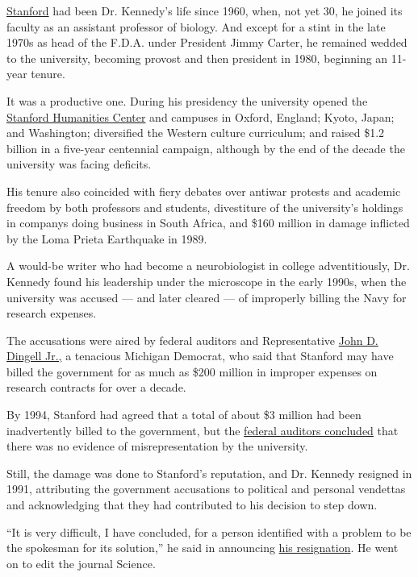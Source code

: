 \href{https://www.stanford.edu/}{Stanford} had been Dr. Kennedy's life
since 1960, when, not yet 30, he joined its faculty as an assistant
professor of biology. And except for a stint in the late 1970s as head
of the F.D.A. under President Jimmy Carter, he remained wedded to the
university, becoming provost and then president in 1980, beginning an
11-year tenure.

It was a productive one. During his presidency the university opened the
\href{http://shc.stanford.edu/}{Stanford Humanities Center} and campuses
in Oxford, England; Kyoto, Japan; and Washington; diversified the
Western culture curriculum; and raised \$1.2 billion in a five-year
centennial campaign, although by the end of the decade the university
was facing deficits.

His tenure also coincided with fiery debates over antiwar protests and
academic freedom by both professors and students, divestiture of the
university's holdings in companys doing business in South Africa, and
\$160 million in damage inflicted by the Loma Prieta Earthquake in 1989.

A would-be writer who had become a neurobiologist in college
adventitiously, Dr. Kennedy found his leadership under the microscope in
the early 1990s, when the university was accused --- and later cleared
--- of improperly billing the Navy for research expenses.

The accusations were aired by federal auditors and Representative
\href{https://www.nytimes.com/2019/02/07/us/politics/john-dingell-dead-longest-congressman.html}{John
D. Dingell Jr.,} a tenacious Michigan Democrat, who said that Stanford
may have billed the government for as much as \$200 million in improper
expenses on research contracts for over a decade.

By 1994, Stanford had agreed that a total of about \$3 million had been
inadvertently billed to the government, but the
\href{https://www.nytimes.com/1994/10/19/us/navy-settles-a-fraud-case-on-stanford-research-costs.html}{federal
auditors concluded} that there was no evidence of misrepresentation by
the university.

Still, the damage was done to Stanford's reputation, and Dr. Kennedy
resigned in 1991, attributing the government accusations to political
and personal vendettas and acknowledging that they had contributed to
his decision to step down.

``It is very difficult, I have concluded, for a person identified with a
problem to be the spokesman for its solution,'' he said in announcing
\href{https://www.nytimes.com/1991/07/30/us/stanford-chief-quits-amid-furor-on-use-of-federal-money.html}{his
resignation}. He went on to edit the journal Science.

